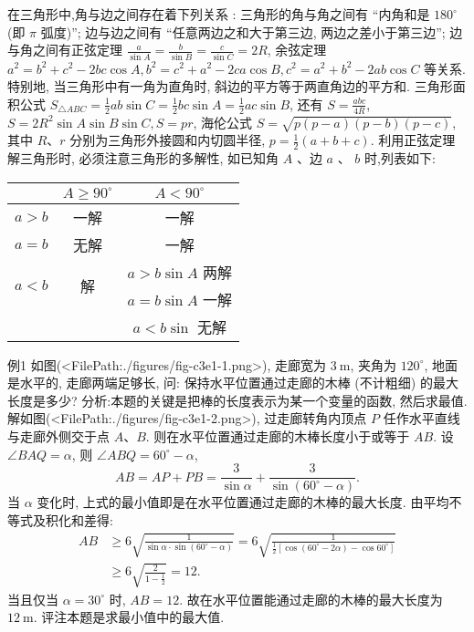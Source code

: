 
在三角形中,角与边之间存在着下列关系 : 三角形的角与角之间有 “内角和是 $180^{\circ}$ (即 $\pi$ 弧度)”; 边与边之间有 “任意两边之和大于第三边, 两边之差小于第三边”; 边与角之间有正弦定理 $\frac{a}{\sin A}=\frac{b}{\sin B}=\frac{c}{\sin C}=2 R$, 余弦定理 $a^2=b^2+c^2-2 b c \cos A, b^2=c^2+a^2-2 c a \cos B, c^2=a^2+b^2-2 a b \cos C$ 等关系.
特别地, 当三角形中有一角为直角时, 斜边的平方等于两直角边的平方和.
三角形面积公式 $S_{\triangle A B C}=\frac{1}{2} a b \sin C=\frac{1}{2} b c \sin A=\frac{1}{2} a c \sin B$, 还有 $S=\frac{a b c}{4 R}$, $S=2 R^2 \sin A \sin B \sin C, S=p r$, 海伦公式 $S=\sqrt{p(p-a)(p-b)(p-c)}$, 其中 $R 、 r$ 分别为三角形外接圆和内切圆半径, $p=\frac{1}{2}(a+b+c)$.
利用正弦定理解三角形时, 必须注意三角形的多解性, 如已知角 $A$ 、边 $a$ 、 $b$ 时,列表如下:
\begin{tabular}{c|c|c}
\hline & $A \geqslant 90^{\circ}$ & $A<90^{\circ}$ \\
\hline$a>b$ & 一解 & 一解 \\
\hline$a=b$ & 无解 & 一解 \\
\hline \multirow{2}{*}{$a<b$} & \multirow{2}{*}{ 解 } & $a>b \sin A$ 两解 \\
& & $a=b \sin A$ 一解 \\
& & $a<b \sin$ 无解 \\
\hline
\end{tabular}



例1 如图(<FilePath:./figures/fig-c3e1-1.png>), 走廊宽为 $3 \mathrm{~m}$, 夹角为 $120^{\circ}$, 地面是水平的, 走廊两端足够长, 问: 保持水平位置通过走廊的木棒 (不计粗细) 的最大长度是多少?
分析:本题的关键是把棒的长度表示为某一个变量的函数, 然后求最值.
解如图(<FilePath:./figures/fig-c3e1-2.png>), 过走廊转角内顶点 $P$ 任作水平直线与走廊外侧交于点 $A 、 B$. 则在水平位置通过走廊的木棒长度小于或等于 $A B$.
设 $\angle B A Q=\alpha$, 则 $\angle A B Q=60^{\circ}-\alpha$,
$$
A B=A P+P B=\frac{3}{\sin \alpha}+\frac{3}{\sin \left(60^{\circ}-\alpha\right)} .
$$
当 $\alpha$ 变化时, 上式的最小值即是在水平位置通过走廊的木棒的最大长度.
由平均不等式及积化和差得:
$$
\begin{aligned}
A B & \geqslant 6 \sqrt{\frac{1}{\sin \alpha \cdot \sin \left(60^{\circ}-\alpha\right)}}=6 \sqrt{\frac{1}{\frac{1}{2}\left[\cos \left(60^{\circ}-2 \alpha\right)-\cos 60^{\circ}\right]}} \\
& \geqslant 6 \sqrt{\frac{2}{1-\frac{1}{2}}}=12 .
\end{aligned}
$$
当且仅当 $\alpha=30^{\circ}$ 时, $A B=12$.
故在水平位置能通过走廊的木棒的最大长度为 $12 \mathrm{~m}$.
评注本题是求最小值中的最大值.




